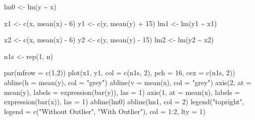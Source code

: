 \documentclass[
  letterpaper,
  DIV=11,
  numbers=noendperiod]{scrreprt}
\newenvironment{Shaded}{\begin{snugshade}}{\end{snugshade}}
\newcommand{\AttributeTok}[1]{\textcolor[rgb]{0.40,0.45,0.13}{#1}}
\newcommand{\DecValTok}[1]{\textcolor[rgb]{0.68,0.00,0.00}{#1}}
\newcommand{\FunctionTok}[1]{\textcolor[rgb]{0.28,0.35,0.67}{#1}}
\newcommand{\NormalTok}[1]{\textcolor[rgb]{0.00,0.23,0.31}{#1}}
\newcommand{\OtherTok}[1]{\textcolor[rgb]{0.00,0.23,0.31}{#1}}
\newcommand{\SpecialCharTok}[1]{\textcolor[rgb]{0.37,0.37,0.37}{#1}}
\newcommand{\StringTok}[1]{\textcolor[rgb]{0.13,0.47,0.30}{#1}}
\begin{document}
\begin{Shaded}
\begin{Highlighting}[]
\NormalTok{lm0 }\OtherTok{\textless{}{-}} \FunctionTok{lm}\NormalTok{(y }\SpecialCharTok{\textasciitilde{}}\NormalTok{ x)}

\NormalTok{x1 }\OtherTok{\textless{}{-}} \FunctionTok{c}\NormalTok{(x, }\FunctionTok{mean}\NormalTok{(x) }\SpecialCharTok{{-}} \DecValTok{6}\NormalTok{)}
\NormalTok{y1 }\OtherTok{\textless{}{-}} \FunctionTok{c}\NormalTok{(y, }\FunctionTok{mean}\NormalTok{(y) }\SpecialCharTok{+} \DecValTok{15}\NormalTok{)}
\NormalTok{lm1 }\OtherTok{\textless{}{-}} \FunctionTok{lm}\NormalTok{(y1 }\SpecialCharTok{\textasciitilde{}}\NormalTok{ x1)}

\NormalTok{x2 }\OtherTok{\textless{}{-}} \FunctionTok{c}\NormalTok{(x, }\FunctionTok{mean}\NormalTok{(x) }\SpecialCharTok{{-}} \DecValTok{6}\NormalTok{)}
\NormalTok{y2 }\OtherTok{\textless{}{-}} \FunctionTok{c}\NormalTok{(y, }\FunctionTok{mean}\NormalTok{(y) }\SpecialCharTok{{-}} \DecValTok{15}\NormalTok{)}
\NormalTok{lm2 }\OtherTok{\textless{}{-}} \FunctionTok{lm}\NormalTok{(y2 }\SpecialCharTok{\textasciitilde{}}\NormalTok{ x2)}

\NormalTok{n1s }\OtherTok{\textless{}{-}} \FunctionTok{rep}\NormalTok{(}\DecValTok{1}\NormalTok{, n)}

\FunctionTok{par}\NormalTok{(}\AttributeTok{mfrow =} \FunctionTok{c}\NormalTok{(}\DecValTok{1}\NormalTok{,}\DecValTok{2}\NormalTok{))}
\FunctionTok{plot}\NormalTok{(x1, y1, }\AttributeTok{col =} \FunctionTok{c}\NormalTok{(n1s, }\DecValTok{2}\NormalTok{), }
    \AttributeTok{pch =} \DecValTok{16}\NormalTok{, }\AttributeTok{cex =} \FunctionTok{c}\NormalTok{(n1s, }\DecValTok{2}\NormalTok{))}
\FunctionTok{abline}\NormalTok{(}\AttributeTok{h =} \FunctionTok{mean}\NormalTok{(y), }\AttributeTok{col =} \StringTok{"grey"}\NormalTok{)}
\FunctionTok{abline}\NormalTok{(}\AttributeTok{v =} \FunctionTok{mean}\NormalTok{(x), }\AttributeTok{col =} \StringTok{"grey"}\NormalTok{)}
\FunctionTok{axis}\NormalTok{(}\DecValTok{2}\NormalTok{, }\AttributeTok{at =} \FunctionTok{mean}\NormalTok{(y), }\AttributeTok{labels =} \FunctionTok{expression}\NormalTok{(}\FunctionTok{bar}\NormalTok{(y)), }\AttributeTok{las =} \DecValTok{1}\NormalTok{)}
\FunctionTok{axis}\NormalTok{(}\DecValTok{1}\NormalTok{, }\AttributeTok{at =} \FunctionTok{mean}\NormalTok{(x), }\AttributeTok{labels =} \FunctionTok{expression}\NormalTok{(}\FunctionTok{bar}\NormalTok{(x)), }\AttributeTok{las =} \DecValTok{1}\NormalTok{)}
\FunctionTok{abline}\NormalTok{(lm0)}
\FunctionTok{abline}\NormalTok{(lm1, }\AttributeTok{col =} \DecValTok{2}\NormalTok{)}
\FunctionTok{legend}\NormalTok{(}\StringTok{"topright"}\NormalTok{, }\AttributeTok{legend =} \FunctionTok{c}\NormalTok{(}\StringTok{"Without Outlier"}\NormalTok{, }\StringTok{"With Outlier"}\NormalTok{), }\AttributeTok{col =} \DecValTok{1}\SpecialCharTok{:}\DecValTok{2}\NormalTok{, }\AttributeTok{lty =} \DecValTok{1}\NormalTok{)}


\end{Highlighting}
\end{Shaded}
\end{document}
